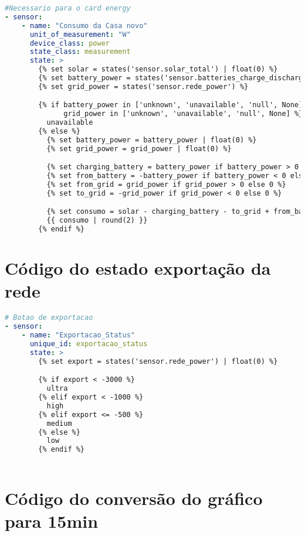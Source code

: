 \lstset{inputencoding=ascii}
\begin{lstlisting}[language=YAML, caption={house\_consumption.yaml}]
#Necessario para o card energy
- sensor:
    - name: "Consumo da Casa novo"
      unit_of_measurement: "W"
      device_class: power
      state_class: measurement
      state: >
        {% set solar = states('sensor.solar_total') | float(0) %}
        {% set battery_power = states('sensor.batteries_charge_discharge_power') %}
        {% set grid_power = states('sensor.rede_power') %}

        {% if battery_power in ['unknown', 'unavailable', 'null', None] or
              grid_power in ['unknown', 'unavailable', 'null', None] %}
          unavailable
        {% else %}
          {% set battery_power = battery_power | float(0) %}
          {% set grid_power = grid_power | float(0) %}

          {% set charging_battery = battery_power if battery_power > 0 else 0 %}
          {% set from_battery = -battery_power if battery_power < 0 else 0 %}
          {% set from_grid = grid_power if grid_power > 0 else 0 %}
          {% set to_grid = -grid_power if grid_power < 0 else 0 %}

          {% set consumo = solar - charging_battery - to_grid + from_battery + from_grid %}
          {{ consumo | round(2) }}
        {% endif %}


\end{lstlisting}

\section{Código do estado exportação da rede}

\lstset{inputencoding=ascii}
\begin{lstlisting}[language=YAML, caption={grid.yaml}]
# Botao de exportacao
- sensor:
    - name: "Exportacao_Status"
      unique_id: exportacao_status
      state: >
        {% set export = states('sensor.rede_power') | float(0) %}

        {% if export < -3000 %}
          ultra
        {% elif export < -1000 %}
          high
        {% elif export <= -500 %}
          medium
        {% else %}
          low
        {% endif %}



\end{lstlisting}



\section{Código do conversão do gráfico para 15min}

